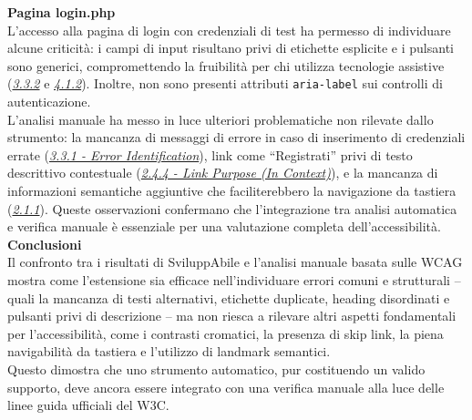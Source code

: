 \noindent \textbf{Pagina login.php}\\
L’accesso alla pagina di login con credenziali di test ha permesso di individuare alcune criticità: i campi di input risultano privi di etichette esplicite e i pulsanti sono generici, compromettendo la fruibilità per chi utilizza tecnologie assistive ({\hyperref[wcag:3.3.2]{\textit{3.3.2}}} e {\hyperref[wcag:4.1.2]{\textit{4.1.2}}}). Inoltre, non sono presenti attributi \texttt{aria-label} sui controlli di autenticazione.\\
L’analisi manuale ha messo in luce ulteriori problematiche non rilevate dallo strumento: la mancanza di messaggi di errore in caso di inserimento di credenziali errate ({\hyperref[wcag:3.3.1]{\textit{3.3.1 - Error Identification}}}), link come “Registrati” privi di testo descrittivo contestuale ({\hyperref[wcag:2.4.4]{\textit{2.4.4 - Link Purpose (In Context)}}}), e la mancanza di informazioni semantiche aggiuntive che faciliterebbero la navigazione da tastiera ({\hyperref[wcag:2.1.1]{\textit{2.1.1}}}). Queste osservazioni confermano che l’integrazione tra analisi automatica e verifica manuale è essenziale per una valutazione completa dell’accessibilità.\\

\noindent \textbf{Conclusioni}\\
Il confronto tra i risultati di SviluppAbile e l’analisi manuale basata sulle WCAG mostra come l’estensione sia efficace nell’individuare errori comuni e strutturali – quali la mancanza di testi alternativi, etichette duplicate, heading disordinati e pulsanti privi di descrizione – ma non riesca a rilevare altri aspetti fondamentali per l’accessibilità, come i contrasti cromatici, la presenza di skip link, la piena navigabilità da tastiera e l’utilizzo di landmark semantici.\\
Questo dimostra che uno strumento automatico, pur costituendo un valido supporto, deve ancora essere integrato con una verifica manuale alla luce delle linee guida ufficiali del W3C.


